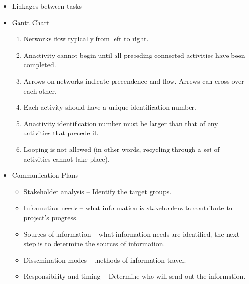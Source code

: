 \documentclass[8pt, letter]{extarticle}
\begin{document}
\begin{multicols}{2}
\begin{itemize}
        \item Linkages between tasks
        \item Gantt Chart
            \begin{enumerate}
                \item Networks flow typically from left to right.
                \item Anactivity cannot begin until all preceding connected activities have been completed.
                \item Arrows on networks indicate precendence and flow. Arrows can cross over each other.
                \item Each activity should have a unique identification number.
                \item Anactivity identification number must be larger than that of any activities that precede it.
                \item Looping is not allowed (in other words, recycling through a set of activities cannot take place).
            \end{enumerate}
        \item Communication Plans
            \begin{itemize}
                \item Stakeholder analysis – Identify the target groups. 
                \item Information needs – what information is stakeholders to contribute to project's progress. 
                \item Sources of information – what information needs are identified, the next step is to determine the sources of information. 
                \item Dissemination modes – methods of information travel. 
                \item Responsibility and timing – Determine who will send out the information.
            \end{itemize}
    \end{itemize}


\end{multicols}
\end{document}
